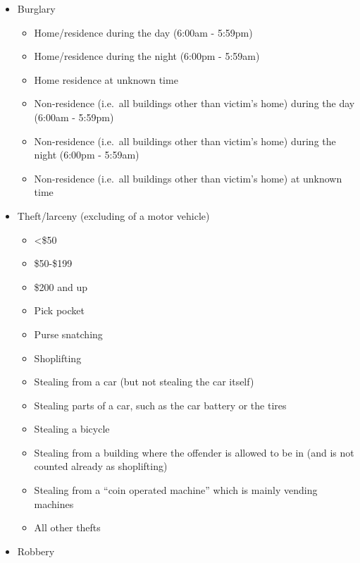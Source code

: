 \documentclass[
  12pt,
  openany]{book}
\providecommand{\tightlist}{%
  \setlength{\itemsep}{0pt}\setlength{\parskip}{0pt}}
\begin{document}
\begin{itemize}
\tightlist
\item
  Burglary

  \begin{itemize}
  \tightlist
  \item
    Home/residence during the day (6:00am - 5:59pm)
  \item
    Home/residence during the night (6:00pm - 5:59am)
  \item
    Home residence at unknown time
  \item
    Non-residence (i.e.~all buildings other than victim's home) during the day (6:00am - 5:59pm)
  \item
    Non-residence (i.e.~all buildings other than victim's home) during the night (6:00pm - 5:59am)
  \item
    Non-residence (i.e.~all buildings other than victim's home) at unknown time
  \end{itemize}
\item
  Theft/larceny (excluding of a motor vehicle)

  \begin{itemize}
  \tightlist
  \item
    \textless\$50
  \item
    \$50-\$199
  \item
    \$200 and up
  \item
    Pick pocket
  \item
    Purse snatching
  \item
    Shoplifting
  \item
    Stealing from a car (but not stealing the car itself)
  \item
    Stealing parts of a car, such as the car battery or the tires
  \item
    Stealing a bicycle
  \item
    Stealing from a building where the offender is allowed to be in (and is not counted already as shoplifting)
  \item
    Stealing from a ``coin operated machine'' which is mainly vending machines
  \item
    All other thefts
  \end{itemize}
\item
  Robbery


\end{itemize}
\end{document}
